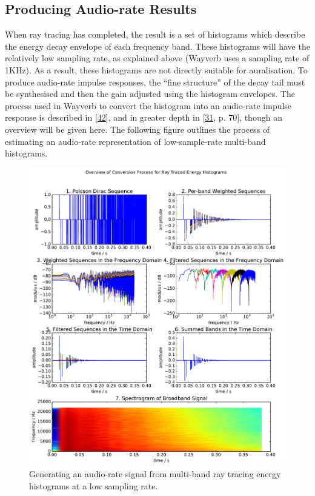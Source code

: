\documentclass[]{scrreprt}
\begin{document}
\subsection{Producing Audio-rate
Results}\label{producing-audio-rate-results}

When ray tracing has completed, the result is a set of histograms which
describe the energy decay envelope of each frequency band. These
histograms will have the relatively low sampling rate, as explained
above (Wayverb uses a sampling rate of 1KHz). As a result, these
histograms are not directly suitable for auralisation. To produce
audio-rate impulse responses, the ``fine structure'' of the decay tail
must be synthesised and then the gain adjusted using the histogram
envelopes. The process used in Wayverb to convert the histogram into an
audio-rate impulse response is described in
{[}\protect\hyperlink{ref-heinzux5fbinauralux5f1993}{42}{]}, and in
greater depth in
{[}\protect\hyperlink{ref-schroderux5fphysicallyux5f2011}{31}, p. 70{]},
though an overview will be given here. The following figure
\text{(\ref{fig:raytrace_process})} outlines the process of estimating
an audio-rate representation of low-sample-rate multi-band histograms.

\begin{figure}[htbp]
\centering
\includegraphics{images/raytrace_process.pdf}
\caption{Generating an audio-rate signal from multi-band ray tracing
energy histograms at a low sampling rate.\label{fig:raytrace_process}}
\end{figure}
\end{document}

